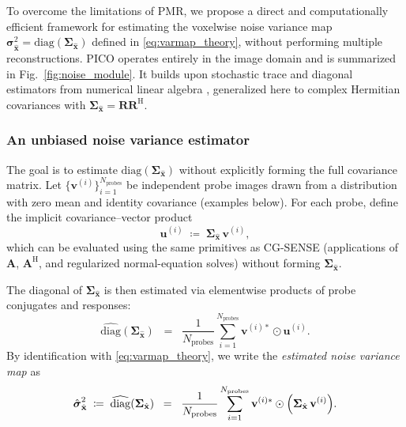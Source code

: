 \documentclass[AMA,STIX2COL,Linenumberson]{MRM}
\begin{document}
To overcome the limitations of PMR, we propose a direct and computationally efficient framework 
for estimating the voxelwise noise variance map 
$\boldsymbol{\sigma}^2_{\hat{\mathbf{x}}}=\mathrm{diag}(\boldsymbol{\Sigma}_{\hat{\mathbf{x}}})$ 
defined in \eqref{eq:varmap_theory}, without performing multiple reconstructions. 
PICO operates entirely in the image domain and is summarized in Fig.~\ref{fig:noise_module}.  
It builds upon stochastic trace and diagonal estimators from numerical linear algebra 
\cite{hutchinson, bekas}, generalized here to complex Hermitian covariances with
$\boldsymbol{\Sigma}_{\hat{\mathbf{x}}}=\mathbf{R}\mathbf{R}^{\mathrm{H}}$.

\subsubsection{An unbiased noise variance estimator}
\label{sec:estimator}
The goal is to estimate $\mathrm{diag}(\boldsymbol{\Sigma}_{\hat{\mathbf{x}}})$
without explicitly forming the full covariance matrix. 
Let $\{\mathbf{v}^{(i)}\}_{i=1}^{N_{\text{probes}}}$ be independent probe images drawn from a distribution
with zero mean and identity covariance (examples below). 
For each probe, define the implicit covariance–vector product
\begin{equation}
\mathbf{u}^{(i)} \;\coloneqq\; \boldsymbol{\Sigma}_{\hat{\mathbf{x}}}\,\mathbf{v}^{(i)},
\label{eq:def-u}
\end{equation}
which can be evaluated using the same primitives as CG-SENSE (applications of $\mathbf{A}$, $\mathbf{A}^{\mathrm{H}}$, and regularized normal-equation solves) without forming $\boldsymbol{\Sigma}_{\hat{\mathbf{x}}}$.

The diagonal of $\boldsymbol{\Sigma}_{\hat{\mathbf{x}}}$ is then estimated via elementwise products of probe conjugates and responses:
\begin{equation}
\widehat{\mathrm{diag}}\!\left(\boldsymbol{\Sigma}_{\hat{\mathbf{x}}}\right)
\;\;=\;\;
\frac{1}{N_{\text{probes}}}\sum_{i=1}^{N_{\text{probes}}}
\mathbf{v}^{(i)*}\odot \mathbf{u}^{(i)}.
\label{eq:diagonal_estimator}
\end{equation}
By identification with \eqref{eq:varmap_theory}, we write the \emph{estimated noise variance map} as
\begin{equation}
\hat{\boldsymbol{\sigma}}^{2}_{\hat{\mathbf{x}}}
\;\coloneqq\;
\widehat{\mathrm{diag}}\!\left(\boldsymbol{\Sigma}_{\hat{\mathbf{x}}}\right)
\;\;=\;\;
\frac{1}{N_{\text{probes}}}\sum_{i=1}^{N_{\text{probes}}}
\mathbf{v}^{(i)*}\odot \Bigl(\boldsymbol{\Sigma}_{\hat{\mathbf{x}}}\,\mathbf{v}^{(i)}\Bigr).
\label{eq:varmap_estimator}
\end{equation}
\end{document}
